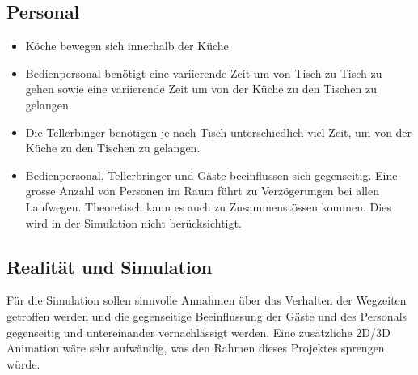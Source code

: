 \documentclass[ngerman,a4paper,12pt]{scrreprt}
\begin{document}
	\subsection{Personal}
		\begin{itemize}
			\item Köche bewegen sich innerhalb der Küche
			\item Bedienpersonal benötigt eine variierende Zeit um von Tisch zu Tisch zu gehen sowie eine variierende Zeit um von der Küche zu den Tischen zu gelangen.
			\item Die Tellerbinger benötigen je nach Tisch unterschiedlich viel Zeit, um von der Küche zu den Tischen zu gelangen.
			\item Bedienpersonal, Tellerbringer und Gäste beeinflussen sich gegenseitig. Eine grosse Anzahl von Personen im Raum führt zu Verzögerungen bei allen Laufwegen. Theoretisch kann es auch zu Zusammenstössen kommen. Dies wird in der Simulation nicht berücksichtigt.
		\end{itemize}

	\subsection{Realität und Simulation}
		Für die Simulation sollen sinnvolle Annahmen über das Verhalten der Wegzeiten getroffen werden und die gegenseitige Beeinflussung der Gäste und des Personals gegenseitig und untereinander vernachlässigt werden. Eine zusätzliche 2D/3D Animation wäre sehr aufwändig, was den Rahmen dieses Projektes sprengen würde.
\end{document}
